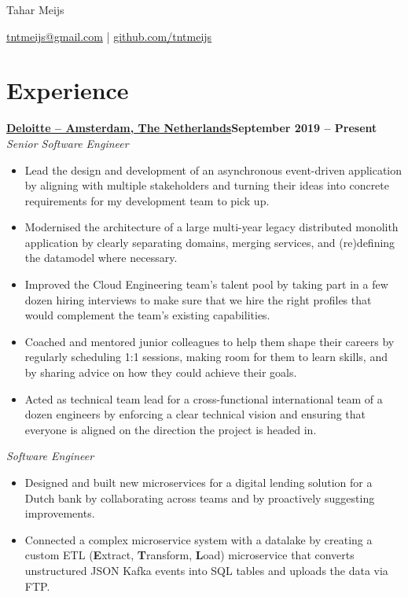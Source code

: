 \documentclass[11pt]{article}       %
\begin{document}
\centerline{\Huge Tahar Meijs}

\vspace{5pt}

\centerline{\href{mailto:tntmeijs@gmail.com}{tntmeijs@gmail.com} | \href{https://github.com/tntmeijs}{github.com/tntmeijs}}

\section*{Experience}
\textbf{\href{https://www.deloitte.com/nl/nl.html}{Deloitte -- Amsterdam, The Netherlands}\hfill September 2019 -- Present} \\
\textit{Senior Software Engineer} \\
\vspace{-9pt}
\begin{itemize}
  \item Lead the design and development of an asynchronous event-driven application by aligning with multiple stakeholders and turning their ideas into concrete requirements for my development team to pick up.
  \item Modernised the architecture of a large multi-year legacy distributed monolith application by clearly separating domains, merging services, and (re)defining the datamodel where necessary.
  \item Improved the Cloud Engineering team's talent pool by taking part in a few dozen hiring interviews to make sure that we hire the right profiles that would complement the team's existing capabilities.
  \item Coached and mentored junior colleagues to help them shape their careers by regularly scheduling 1:1 sessions, making room for them to learn skills, and by sharing advice on how they could achieve their goals.
  \item Acted as technical team lead for a cross-functional international team of a dozen engineers by enforcing a clear technical vision and ensuring that everyone is aligned on the direction the project is headed in.
\end{itemize}

\textit{Software Engineer} \\
\vspace{-9pt}
\begin{itemize}
  \item Designed and built new microservices for a digital lending solution for a Dutch bank by collaborating across teams and by proactively suggesting improvements.
  \item Connected a complex microservice system with a datalake by creating a custom ETL (\textbf{E}xtract, \textbf{T}ransform, \textbf{L}oad) microservice that converts unstructured JSON Kafka events into SQL tables and uploads the data via FTP.
\end{itemize}
\end{document}

